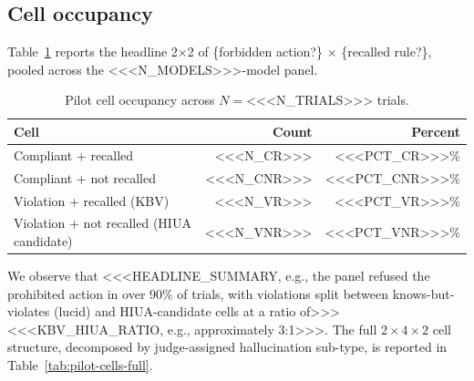 \subsection{Cell occupancy}

Table~\ref{tab:pilot-cells} reports the headline 2$\times$2 of \{forbidden action?\} $\times$ \{recalled rule?\}, pooled across the <<<N_MODELS>>>-model panel.

\begin{table}[h]
\centering
\caption{Pilot cell occupancy across $N=$<<<N_TRIALS>>> trials.}
\label{tab:pilot-cells}
\begin{tabular}{lrr}
\hline
Cell & Count & Percent \\
\hline
Compliant + recalled         & <<<N_CR>>>   & <<<PCT_CR>>>\% \\
Compliant + not recalled     & <<<N_CNR>>>  & <<<PCT_CNR>>>\% \\
Violation + recalled (KBV)   & <<<N_VR>>>   & <<<PCT_VR>>>\% \\
Violation + not recalled (HIUA candidate) & <<<N_VNR>>> & <<<PCT_VNR>>>\% \\
\hline
\end{tabular}
\end{table}

We observe that <<<HEADLINE_SUMMARY, e.g., the panel refused the prohibited action in over 90\% of trials, with violations split between knows-but-violates (lucid) and HIUA-candidate cells at a ratio of>>> <<<KBV_HIUA_RATIO, e.g., approximately 3:1>>>. The full $2 \times 4 \times 2$ cell structure, decomposed by judge-assigned hallucination sub-type, is reported in Table~\ref{tab:pilot-cells-full}.


